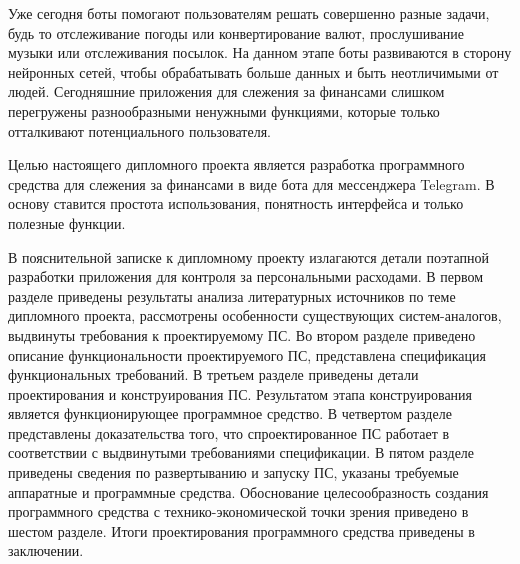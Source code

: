 Уже сегодня боты помогают пользователям решать совершенно разные задачи, будь то отслеживание погоды или конвертирование валют, прослушивание музыки или отслеживания посылок. На данном этапе боты развиваются в сторону нейронных сетей, чтобы обрабатывать больше данных и быть неотличимыми от людей. Сегодняшние приложения для слежения за финансами слишком перегружены разнообразными ненужными функциями, которые только отталкивают потенциального пользователя.

Целью настоящего дипломного проекта является разработка программного средства для слежения за финансами в виде бота для мессенджера Telegram. В основу ставится простота использования, понятность интерфейса и только полезные функции.

В пояснительной записке к дипломному проекту излагаются детали поэтапной разработки приложения для контроля за персональными расходами. В первом разделе приведены результаты анализа литературных источников по теме дипломного проекта, рассмотрены особенности существующих систем-аналогов, выдвинуты требования к проектируемому ПС. Во втором разделе приведено описание функциональности проектируемого ПС, представлена спецификация функциональных требований. В третьем разделе приведены детали проектирования и конструирования ПС. Результатом этапа конструирования является функционирующее программное средство. В четвертом разделе представлены доказательства того, что спроектированное ПС работает в соответствии с выдвинутыми требованиями спецификации. В пятом разделе приведены сведения по развертыванию и запуску ПС, указаны требуемые аппаратные и программные средства. Обоснование целесообразность создания программного средства с технико-экономической точки зрения приведено в шестом разделе. Итоги проектирования программного средства приведены в заключении.